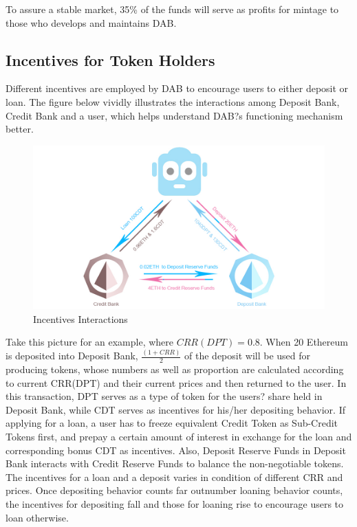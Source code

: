\documentclass[review]{elsarticle}
\begin{document}
To assure a stable market, 35\% of the funds will serve as profits for mintage to those who develops and maintains DAB.

\subsection{Incentives for Token Holders}
Different incentives are employed by DAB to encourage users to either deposit or loan. The figure below vividly illustrates the interactions among Deposit Bank, Credit Bank and a user, which helps understand DAB?s functioning mechanism better.

\begin{figure}[H]
\begin{center}
\includegraphics[width=4.5in]{Graphs/EE.jpg}
\end{center}
\caption{Incentives Interactions}\label{TS}
\end{figure}

Take this picture for an example, where ${CRR(DPT) = 0.8}$. When 20 Ethereum is deposited into Deposit Bank, ${\frac{(1 + CRR)}{2}}$ of the deposit will be used for producing tokens, whose numbers as well as proportion are calculated according to current CRR(DPT) and their current prices and then returned to the user. In this transaction, DPT serves as a type of token for the users? share held in Deposit Bank, while CDT serves as incentives for his/her depositing behavior. If applying for a loan, a user has to freeze equivalent Credit Token as Sub-Credit Tokens first, and prepay a certain amount of interest in exchange for the loan and corresponding bonus CDT as incentives. Also, Deposit Reserve Funds in Deposit Bank interacts with Credit Reserve Funds to balance the non-negotiable tokens.
The incentives for a loan and a deposit varies in condition of different CRR and prices. Once depositing behavior counts far outnumber loaning behavior counts, the incentives for depositing fall and those for loaning rise to encourage users to loan otherwise.
\end{document}

